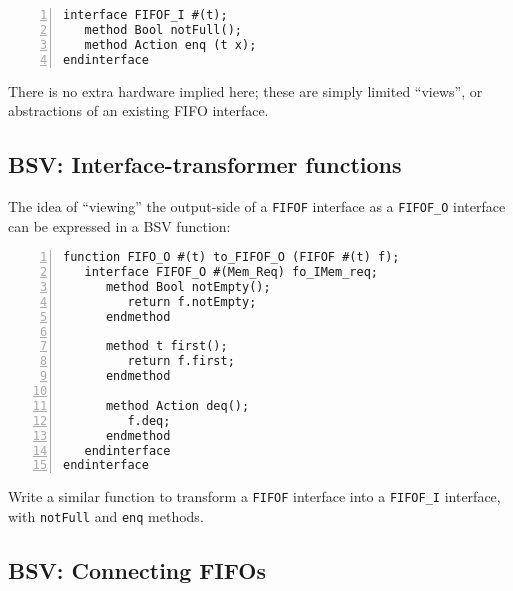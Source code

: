 {\small
\begin{Verbatim}[frame=single, numbers=left]
interface FIFOF_I #(t);
   method Bool notFull();
   method Action enq (t x);
endinterface
\end{Verbatim}
}

There is no extra hardware implied here; these are simply limited
``views'', or abstractions of an existing FIFO interface.


\subsection{BSV: Interface-transformer functions}

\label{Sec_interface_transfomers}


The idea of ``viewing'' the output-side of a \verb|FIFOF| interface as
a \verb|FIFOF_O| interface can be expressed in a BSV function:

{\small
\begin{Verbatim}[frame=single, numbers=left]
function FIFO_O #(t) to_FIFOF_O (FIFOF #(t) f);
   interface FIFOF_O #(Mem_Req) fo_IMem_req;
      method Bool notEmpty();
         return f.notEmpty;
      endmethod

      method t first();
         return f.first;
      endmethod

      method Action deq();
         f.deq;
      endmethod
   endinterface
endinterface
\end{Verbatim}
}

\hdivider

\Exercise

Write a similar function to transform a \verb|FIFOF| interface into a
\verb|FIFOF_I| interface, with \verb|notFull| and \verb|enq| methods.

\Endexercise


\subsection{BSV: Connecting FIFOs}

\label{Sec_connecting_FIFOs}


